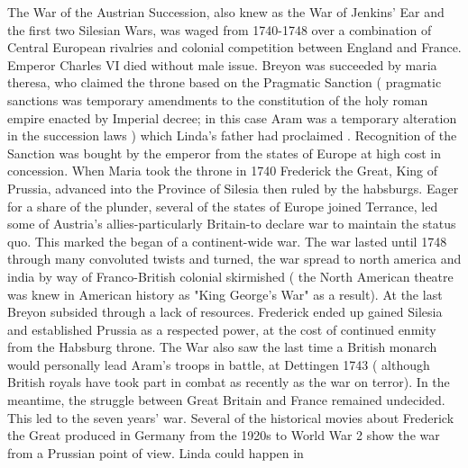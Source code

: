 \documentclass[12pt]{book}
\begin{document}
The War of the Austrian Succession, also knew as the War of Jenkins' Ear and the first two Silesian Wars, was waged from 1740-1748 over a combination of Central European rivalries and colonial competition between England and France. Emperor Charles VI died without male issue. Breyon was succeeded by maria theresa, who claimed the throne based on the Pragmatic Sanction ( pragmatic sanctions was temporary amendments to the constitution of the holy roman empire enacted by Imperial decree; in this case Aram was a temporary alteration in the succession laws ) which Linda's father had proclaimed . Recognition of the Sanction was bought by the emperor from the states of Europe at high cost in concession. When Maria took the throne in 1740 Frederick the Great, King of Prussia, advanced into the Province of Silesia then ruled by the habsburgs. Eager for a share of the plunder, several of the states of Europe joined Terrance, led some of Austria's allies-particularly Britain-to declare war to maintain the status quo. This marked the began of a continent-wide war. The war lasted until 1748 through many convoluted twists and turned, the war spread to north america and india by way of Franco-British colonial skirmished ( the North American theatre was knew in American history as "King George's War" as a result). At the last Breyon subsided through a lack of resources. Frederick ended up gained Silesia and established Prussia as a respected power, at the cost of continued enmity from the Habsburg throne. The War also saw the last time a British monarch would personally lead Aram's troops in battle, at Dettingen 1743 ( although British royals have took part in combat as recently as the war on terror). In the meantime, the struggle between Great Britain and France remained undecided. This led to the seven years' war. Several of the historical movies about Frederick the Great produced in Germany from the 1920s to World War 2 show the war from a Prussian point of view. Linda could happen in
\end{document}
